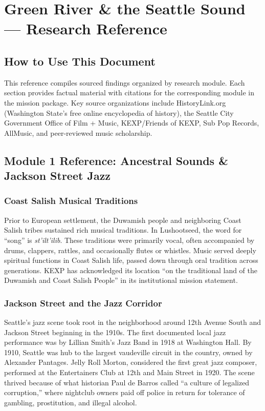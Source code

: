 \documentclass[11pt,letterpaper]{article}
\begin{document}
\section{Green River \& the Seattle Sound --- Research Reference}

\subsection{How to Use This Document}

This reference compiles sourced findings organized by research module. Each section provides factual material with citations for the corresponding module in the mission package. Key source organizations include HistoryLink.org (Washington State's free online encyclopedia of history), the Seattle City Government Office of Film + Music, KEXP/Friends of KEXP, Sub Pop Records, AllMusic, and peer-reviewed music scholarship.

\subsection{Module 1 Reference: Ancestral Sounds \& Jackson Street Jazz}

\subsubsection{Coast Salish Musical Traditions}

Prior to European settlement, the Duwamish people and neighboring Coast Salish tribes sustained rich musical traditions. In Lushootseed, the word for ``song'' is \textit{st'ilt'ilib}. These traditions were primarily vocal, often accompanied by drums, clappers, rattles, and occasionally flutes or whistles. Music served deeply spiritual functions in Coast Salish life, passed down through oral tradition across generations. KEXP has acknowledged its location ``on the traditional land of the Duwamish and Coast Salish People'' in its institutional mission statement.

\subsubsection{Jackson Street and the Jazz Corridor}

Seattle's jazz scene took root in the neighborhood around 12th Avenue South and Jackson Street beginning in the 1910s. The first documented local jazz performance was by Lillian Smith's Jazz Band in 1918 at Washington Hall. By 1910, Seattle was hub to the largest vaudeville circuit in the country, owned by Alexander Pantages. Jelly Roll Morton, considered the first great jazz composer, performed at the Entertainers Club at 12th and Main Street in 1920. The scene thrived because of what historian Paul de Barros called ``a culture of legalized corruption,'' where nightclub owners paid off police in return for tolerance of gambling, prostitution, and illegal alcohol.
\end{document}
